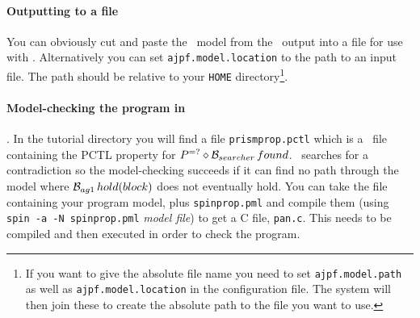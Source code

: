 \documentclass[a4]{article}
\begin{document}
\paragraph{Outputting to a file} You can obviously cut and paste the \prism\ model from the \ajpf\ output into a file for use with \prism.  Alternatively you can set \texttt{ajpf.model.location} to the path to an input file.  The path should be relative to your \texttt{HOME} directory\footnote{If you want to give the absolute file name you need to set \texttt{ajpf.model.path} as well as \texttt{ajpf.model.location} in the configuration file.  The system will then join these to create the absolute path to the file you want to use.}.

\paragraph{Model-checking the program in \prism}.  In the tutorial directory you will find a file \texttt{prismprop.pctl} which is a \prism\ file containing the PCTL property for $P^{=?}\diamond \mathrm{{\cal B}}_{searcher} \, found$.  \spin\ searches for a contradiction so the model-checking succeeds if it can find no path through the model where $\mathrm{{\cal B}}_{ag1} \, hold(block)$ does not eventually hold.  You can take the file containing  your program model, plus \texttt{spinprop.pml} and compile them (using \texttt{spin -a -N spinprop.pml} \emph{model file}) to get a C file, \texttt{pan.c}.  This needs to be compiled and then executed in order to check the program.



\end{document}
